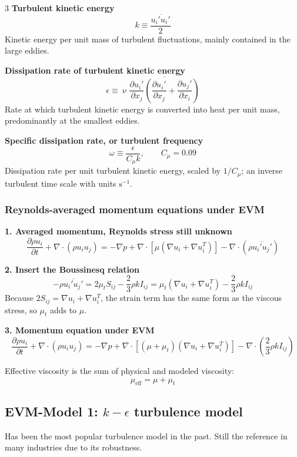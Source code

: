 \documentclass[landscape, a4paper]{article}
\renewcommand{\nu}{\upnu}
\begin{document}
\begin{multicols*}{3}
\newcolumn
\textbf{Turbulent kinetic energy}
\[
  k\equiv\frac{\overline{u_i'u_i'}}{2}
\]
Kinetic energy per unit mass of turbulent fluctuations, mainly contained in the large eddies.

\textbf{Dissipation rate of turbulent kinetic energy}
\[
  \epsilon\equiv\nu\overline{
    \frac{\partial u_i'}{\partial x_j}
    \left(\frac{\partial u_i'}{\partial x_j}
    +\frac{\partial u_j'}{\partial x_i}\right)}
\]
Rate at which turbulent kinetic energy is converted into heat per unit mass, predominantly at the smallest eddies.

\textbf{Specific dissipation rate, or turbulent frequency}
\[
  \omega\equiv\frac{\epsilon}{C_\mu k},
  \qquad C_\mu=0.09
\]
Dissipation rate per unit turbulent kinetic energy, scaled by $1/C_\mu$; an inverse turbulent time scale with units $\mathrm{s}^{-1}$.

\subsubsection{Reynolds-averaged momentum equations under EVM}
\textbf{1. Averaged momentum, Reynolds stress still unknown}
\[
  \frac{\partial\rho u_i}{\partial t}
  +\nabla\cdot(\rho u_i u_j)
  =-\nabla p
  +\nabla\cdot\left[\mu\left(\nabla u_i+\nabla u_i^T\right)\right]
  -\nabla\cdot\left(\rho\overline{u_i'u_j'}\right)
\]

\textbf{2. Insert the Boussinesq relation}
\[
  -\rho\overline{u_i'u_j'}
  =2\mu_t S_{ij}-\frac{2}{3}\rho k I_{ij}
  =\mu_t\left(\nabla u_i+\nabla u_i^T\right)
  -\frac{2}{3}\rho k I_{ij}
\]
Because $2S_{ij}=\nabla u_i+\nabla u_i^T$, the strain term has the same form as the viscous stress, so $\mu_t$ adds to $\mu$.

\textbf{3. Momentum equation under EVM}
{\footnotesize\[
  \frac{\partial\rho u_i}{\partial t}
  +\nabla\cdot(\rho u_i u_j)
  =-\nabla p
  +\nabla\cdot\left[(\mu+\mu_t)\left(\nabla u_i+\nabla u_i^T\right)\right]
  -\nabla\cdot\left(\frac{2}{3}\rho k I_{ij}\right)
\]}

Effective viscosity is the sum of physical and modeled viscosity:
\[
  \mu_{\mathrm{eff}}=\mu+\mu_t
\]

\subsection{EVM-Model 1: $k-\epsilon$ turbulence model}
Has been the most popular turbulence model in the past. Still the reference in many industries due to its robustness.


\end{multicols*}
\end{document}
